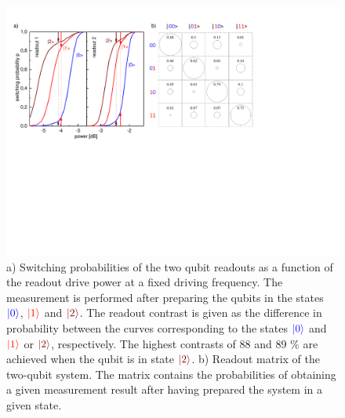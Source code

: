 \begin{figure}[ht!]
	\centering
		\includegraphics[width=1.\textwidth]{./material/papers/grover/figures/simultaneous_readout_characteristics}
	\caption[Switching probabilities of the two qubit readouts as a function of the readout excitation power]{a) Switching probabilities of the two qubit readouts as a function of the readout drive power at a fixed driving frequency. The measurement is performed after preparing the qubits in the states $\color{blue}{\left| 0 \right>}$, $\color{red}{\left| 1 \right>}$ and $\color{brown}{\ket{2}}$. The readout contrast is given as the difference in probability between the curves corresponding to the states $\color{blue}{\left| 0 \right>}$ and $\color{red}{\left| 1 \right>}$ or $\color{brown}{\ket{2}}$, respectively. The highest contrasts of 88 and 89 \% are achieved when the qubit is in state $\color{brown}{\ket{2}}$. b) Readout matrix of the two-qubit system. The matrix contains the probabilities of obtaining a given measurement result after having prepared the system in a given state. }
	\label{fig:qubit_readout_characteristics}
\end{figure}

